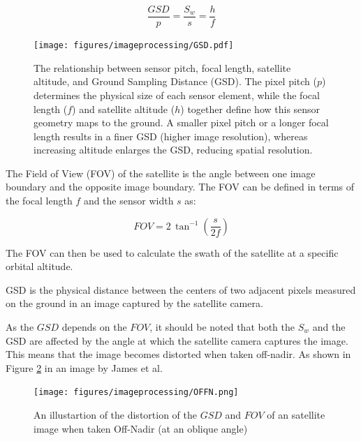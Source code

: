 \begin{equation}
    \frac{GSD}{p} = \frac{S_w}{s} = \frac{h}{f}
\end{equation}

\begin{figure}[H]
    \centering
    \texttt{[image: figures/imageprocessing/GSD.pdf]}
    \caption{The relationship between sensor pitch, focal length, satellite altitude, and Ground Sampling Distance (GSD). The pixel pitch ($p$) determines the physical size of each sensor element, while the focal length ($f$) and satellite altitude ($h$) together define how this sensor geometry maps to the ground. A smaller pixel pitch or a longer focal length results in a finer GSD (higher image resolution), whereas increasing altitude enlarges the GSD, reducing spatial resolution.}
    \label{fig:GSD}
\end{figure}

\noindent
The Field of View (FOV) of the satellite is the angle between one image boundary and the opposite image boundary. 
The FOV can be defined in terms of the focal length $f$ and the sensor width $s$ as:

\begin{equation}
    FOV = 2 \, \tan^{-1}\left( \frac{s}{2f} \right)
\end{equation}

\noindent
The FOV can then be used to calculate the swath of the satellite at a specific orbital altitude.
\vspace{0.5cm}

\noindent
GSD is the physical distance between the centers of two adjacent 
pixels measured on the ground in an image captured by the satellite camera.

\noindent
As the $GSD$ depends on the $FOV$, it should be noted that both the $S_w$ and the GSD are affected by the angle 
at which the satellite camera captures the image. This means that the image becomes distorted when taken off-nadir. 
As shown in Figure \ref{fig:OffNadir} in an image by James et al. \cite{OFFN}

\begin{figure}[H]
    \centering
    \texttt{[image: figures/imageprocessing/OFFN.png]}
    \caption{An illustartion of the distortion of the $GSD$ and $FOV$ of an satellite image when taken Off-Nadir (at an oblique angle) \cite{OFFN}}
    \label{fig:OffNadir}
\end{figure}

